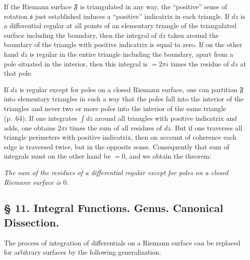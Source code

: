 \documentclass{article}
\begin{document}
If the Riemann surface $\mathfrak{F}$ is triangulated in any way, the ``positive'' sense of rotation $\mathfrak{s}$ just established induces a ``positive'' indicatrix in each triangle. If $dz$ is a differential regular at all points of an elementary triangle of the triangulated surface including the boundary, then the integral of $dz$ taken around the boundary of the triangle with positive indicatrix is equal to zero. If on the other hand $dz$ is regular in the entire triangle including the boundary, apart from a pole situated in the interior, then this integral is $= 2\pi i$ times the residue of $dz$ at that pole.

If $dz$ is regular except for poles on a closed Riemann surface, one can partition $\mathfrak{F}$ into elementary triangles in such a way that the poles fall into the interior of the triangles and never two or more poles into the interior of the same triangle (p.~64). If one integrates $\displaystyle\int dz$ around all triangles with positive indicatrix and adds, one obtains $2\pi i$ times the sum of all residues of $dz$. But if one traverses all triangle perimeters with positive indicatrix, then on account of coherence each edge is traversed twice, but in the opposite sense. Consequently that sum of integrals must on the other hand be $= 0$, and we obtain the theorem:

\emph{The sum of the residues of a differential regular except for poles on a closed Riemann surface is $0$.}


\subsection*{§ 11. Integral Functions. Genus. Canonical Dissection.}

The process of integration of differentials on a Riemann surface can be replaced for arbitrary surfaces by the following generalization.
\end{document}
